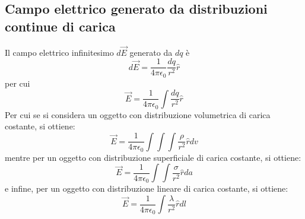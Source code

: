 \documentclass[a4paper]{extarticle}
\begin{document}
\vspace{1em}
\noindent
\subsection{Campo elettrico generato da distribuzioni continue di carica}
Il campo elettrico infinitesimo $d \vec{E}$ generato da $dq$ è 
\[d \vec{E} = \frac{1}{4 \pi \epsilon_0} \frac{dq}{r^2} \hat{r}\]
per cui
\[\vec E = \frac{1}{4 \pi \epsilon_0} \int \frac{dq}{r^2} \hat{r}\]
Per cui se si considera un oggetto con distribuzione volumetrica di carica costante, si ottiene:
\[\vec E = \frac{1}{4 \pi \epsilon_0} \int \int \int \frac{\rho}{r^2} \hat{r} dv\]
mentre per un oggetto con distribuzione superficiale di carica costante, si ottiene:
\[\vec E = \frac{1}{4 \pi \epsilon_0} \int \int \frac{\sigma}{r^2} \hat{r} da\]
e infine, per un oggetto con distribuzione lineare di carica costante, si ottiene:
\[\vec E = \frac{1}{4 \pi \epsilon_0} \int \frac{\lambda}{r^2} \hat{r} dl\]

\vspace{1em}
\noindent
\end{document}
